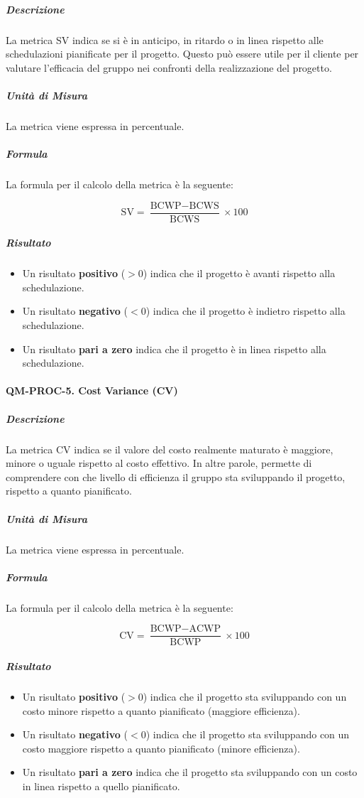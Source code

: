			\subparagraph{Descrizione}
			La metrica SV indica se si è in anticipo, in ritardo o in linea rispetto alle schedulazioni pianificate per il progetto. Questo può essere utile per il cliente per valutare l'efficacia del gruppo nei confronti della realizzazione del progetto.

			\subparagraph{Unità di Misura}
			La metrica viene espressa in percentuale.

			\subparagraph{Formula}
			La formula per il calcolo della metrica è la seguente:

			\[
				\text{SV} = \frac{\text{BCWP} - \text{BCWS}}{\text{BCWS}} \times 100
			\]

			\subparagraph{Risultato}
			\begin{itemize}
				\item Un risultato \textbf{positivo} (\(> 0\)) indica che il progetto è avanti rispetto alla schedulazione.
				\item Un risultato \textbf{negativo} (\(< 0\)) indica che il progetto è indietro rispetto alla schedulazione.
				\item Un risultato \textbf{pari a zero} indica che il progetto è in linea rispetto alla schedulazione.
			\end{itemize}

		\paragraph{QM-PROC-5. Cost Variance (CV)}

			\subparagraph{Descrizione}
			La metrica CV indica se il valore del costo realmente maturato è maggiore, minore o uguale rispetto al costo effettivo. In altre parole, permette di comprendere con che livello di efficienza il gruppo sta sviluppando il progetto, rispetto a quanto pianificato.

			\subparagraph{Unità di Misura}
			La metrica viene espressa in percentuale.

			\subparagraph{Formula}
			La formula per il calcolo della metrica è la seguente:

			\[
				\text{CV} = \frac{\text{BCWP} - \text{ACWP}}{\text{BCWP}} \times 100
			\]

			\subparagraph{Risultato}
			\begin{itemize}
				\item Un risultato \textbf{positivo} (\(> 0\)) indica che il progetto sta sviluppando con un costo minore rispetto a quanto pianificato (maggiore efficienza).
				\item Un risultato \textbf{negativo} (\(< 0\)) indica che il progetto sta sviluppando con un costo maggiore rispetto a quanto pianificato (minore efficienza).
				\item Un risultato \textbf{pari a zero} indica che il progetto sta sviluppando con un costo in linea rispetto a quello pianificato.
			\end{itemize}
	
